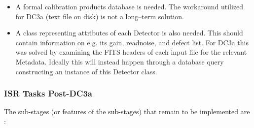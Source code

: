 \begin{itemize}
\item A formal calibration products database is needed.  The workaround 
utilized for DC3a (text file on disk) is not a long--term solution.

\item A class representing attributes of each Detector is also needed.  
This should contain information on e.g. its gain, readnoise, and
defect list.  For DC3a this was solved by examining the FITS headers of
each input file for the relevant Metadata.  Ideally this will instead
happen through a database query constructing an instance of this
Detector class.


\end{itemize}

\subsubsection{ISR Tasks Post-DC3a}

The sub-stages (or features of the sub-stages) that remain to be
implemented are :

